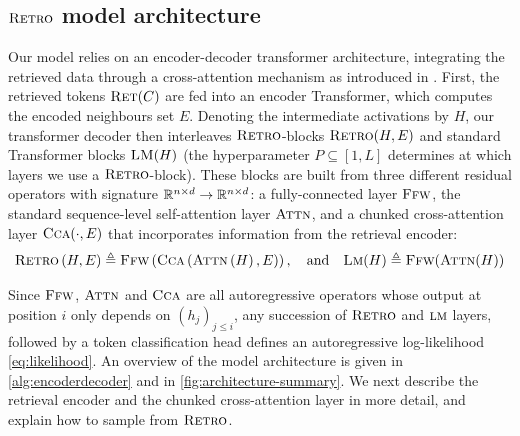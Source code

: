 \documentclass[11pt, a4paper, logo]{deepmind}
\newcommand{\ffw} {\textsc{Ffw}}
\newcommand{\attn}{\textsc{Attn}}
\newcommand{\ccca}{\textsc{Cca}}
\newcommand{\ret}{\textsc{Ret}}
\newcommand{\retro}{\textsc{Retro}\xspace}
\begin{document}
\subsection{$\retro$ model architecture}
\label{subsec-model}
Our model relies on an encoder-decoder transformer architecture, integrating the retrieved data through a cross-attention mechanism as introduced in \citet{vaswani2017attention}.
First, the retrieved tokens $\ret(C)$ are fed into an encoder Transformer, which computes the encoded neighbours set $E$.
Denoting the intermediate activations by $H$, our transformer decoder then interleaves $\retro$-blocks $\retro (H, E)$ and standard Transformer blocks $\textsc{LM}(H)$ (the hyperparameter $P \subseteq [1, L]$ determines at which layers we use a $\retro$-block).
These blocks are built from three different residual operators with signature $\mathbb{R}^{n \times d} \to \mathbb{R}^{n \times d}$: a fully-connected layer $\ffw$, the standard sequence-level self-attention layer $\attn$, and a chunked cross-attention layer $\ccca( \cdot, E)$ that incorporates information from the retrieval encoder:
\begin{equation}
   \retro \left(H, E\right) \triangleq \ffw \left( \ccca\left( \attn\left(H\right) , E\right) \right),\quad\text{and}\quad
    \textsc{Lm}(H) \triangleq \ffw(\attn(H))
\end{equation}

Since $\ffw$, $\attn$ and $\ccca$ are all autoregressive operators whose output at position $i$ only depends on $(h_{j})_{j \leq i}$, any succession of $\retro$ and $\textsc{lm}$ layers, followed by a token classification head defines an autoregressive log-likelihood \eqref{eq:likelihood}. 
An overview of the model architecture is given in \autoref{alg:encoderdecoder} and in \autoref{fig:architecture-summary}.
We next describe the retrieval encoder and the chunked cross-attention layer in more detail, and explain how to sample from $\retro$.
\end{document}
